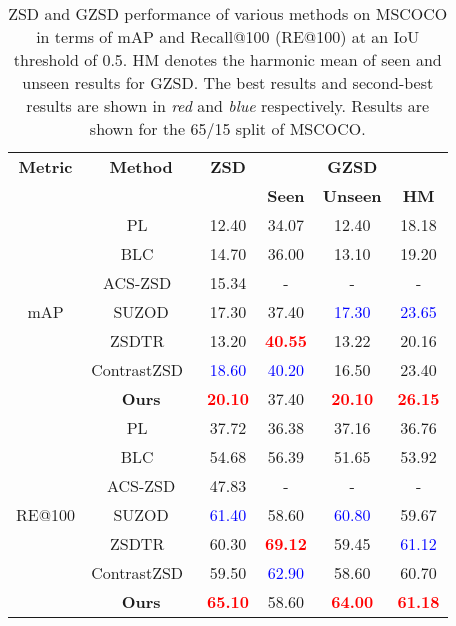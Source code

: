 \documentclass{bmvc2k}
\begin{document}
\begin{table}[t]
	\caption{ZSD and GZSD performance of various methods on MSCOCO in terms of mAP and Recall@100 (RE@100) at an IoU threshold of 0.5. HM denotes the harmonic mean of seen and unseen results for GZSD. The best results and second-best results are shown in \textit{red} and \textit{blue} respectively. Results are shown for the 65/15 split of MSCOCO.}
	\label{tab:zsd1-coco-mapre}
	
	\centering
	\begin{tabular}{|c|c|c|c|c|c|}
		\hline
{\bf Metric} & {\bf Method} & {\bf ZSD} & \multicolumn{3}{|c|}{{\bf GZSD}} \\ 
		\cline{4-6}
&  &  & {\bf Seen} & {\bf Unseen} & {\bf HM} \\ \hline
		\multirow{7}{*}{mAP}
& PL~\cite{rahman2018polarity}  & 12.40& 34.07 & 12.40 & 18.18 \\
		
		& BLC~\cite{zheng2020background} &14.70 &36.00 &13.10 &19.20 \\
& ACS-ZSD~\cite{mao2020zero} &15.34 &- &- &- \\
		& SUZOD\cite{hayat2020synthesizing} &17.30  &  37.40 & \textcolor{blue}{17.30} & \textcolor{blue}{23.65} \\
		
		& ZSDTR~\cite{zheng2021zero} & 13.20 & {\bf \textcolor{red}{40.55}} & 13.22 & 20.16 \\
		& ContrastZSD~\cite{yan2022semantics}  & \textcolor{blue}{18.60} & \textcolor{blue}{40.20} & 16.50 & 23.40 \\
		
		\cline{2-6}
		
		& {\bf Ours}  & {\bf \textcolor{red}{20.10}} & 37.40 & {\bf \textcolor{red}{20.10}} & {\bf \textcolor{red}{26.15}} \\ 
		\hline
		
		\multirow{7}{*}{RE@100} 
& PL~\cite{rahman2018polarity} & 37.72& 36.38 & 37.16 & 36.76 \\
		
		& BLC~\cite{zheng2020background} & 54.68 & 56.39 & 51.65 & 53.92 \\
& ACS-ZSD\cite{mao2020zero} &47.83 &- &- &- \\
		& SUZOD\cite{hayat2020synthesizing}  & \textcolor{blue}{61.40} &  58.60 & \textcolor{blue}{60.80} & 59.67 \\
		& ZSDTR~\cite{zheng2021zero} & 60.30 &  {\bf \textcolor{red}{69.12}} &  59.45 & \textcolor{blue}{ 61.12} \\
		& ContrastZSD~\cite{yan2022semantics}  &59.50& \textcolor{blue}{62.90} & 58.60 & 60.70 \\
		\cline{2-6}
		
		& {\bf Ours} & {\bf \textcolor{red}{65.10}} & 58.60 & {\bf \textcolor{red}{64.00}} & {\bf \textcolor{red}{61.18}} \\ \hline  
	\end{tabular}
\end{table}
\end{document}
